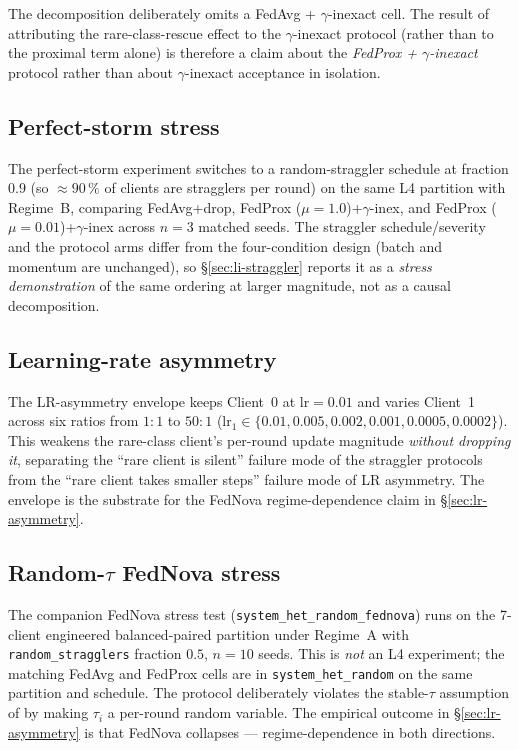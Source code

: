 \documentclass[11pt,a4paper]{report}
\begin{document}
The decomposition deliberately omits a FedAvg + $\gamma$-inexact cell.
The result of attributing the rare-class-rescue effect to the
$\gamma$-inexact protocol (rather than to the proximal term alone) is
therefore a claim about the \emph{FedProx + $\gamma$-inexact} protocol
rather than about $\gamma$-inexact acceptance in isolation.

\subsection{Perfect-storm stress}

The perfect-storm experiment switches to a random-straggler schedule at
fraction $0.9$ (so $\approx 90\,\%$ of clients are stragglers per
round) on the same L4 partition with Regime~B, comparing FedAvg+drop,
FedProx ($\mu = 1.0$)+$\gamma$-inex, and FedProx ($\mu = 0.01$)+$\gamma$-inex
across $n = 3$ matched seeds. The straggler schedule/severity and the
protocol arms differ from the four-condition design (batch and momentum
are unchanged), so §\ref{sec:li-straggler} reports it as a \emph{stress
demonstration} of the same ordering at larger magnitude, not as a
causal decomposition.

\subsection{Learning-rate asymmetry}

The LR-asymmetry envelope keeps Client~0 at $\textrm{lr} = 0.01$ and
varies Client~1 across six ratios from $1{:}1$ to $50{:}1$
($\textrm{lr}_1 \in \{0.01, 0.005, 0.002, 0.001, 0.0005, 0.0002\}$).
This weakens the rare-class client's per-round update magnitude
\emph{without dropping it}, separating the ``rare client is silent''
failure mode of the straggler protocols from the ``rare client takes
smaller steps'' failure mode of LR asymmetry. The envelope is the
substrate for the FedNova regime-dependence claim in
§\ref{sec:lr-asymmetry}.

\subsection{Random-$\tau$ FedNova stress}

The companion FedNova stress test (\texttt{system\_het\_random\_fednova})
runs on the 7-client engineered balanced-paired partition under
Regime~A with \texttt{random\_stragglers} fraction $0.5$, $n = 10$
seeds. This is \emph{not} an L4 experiment; the matching FedAvg and
FedProx cells are in \texttt{system\_het\_random} on the same partition
and schedule. The protocol deliberately violates the stable-$\tau$
assumption of \citet{wang2020fednova} by making $\tau_i$ a per-round
random variable. The empirical outcome in §\ref{sec:lr-asymmetry} is
that FedNova collapses --- regime-dependence in both directions.
\end{document}
